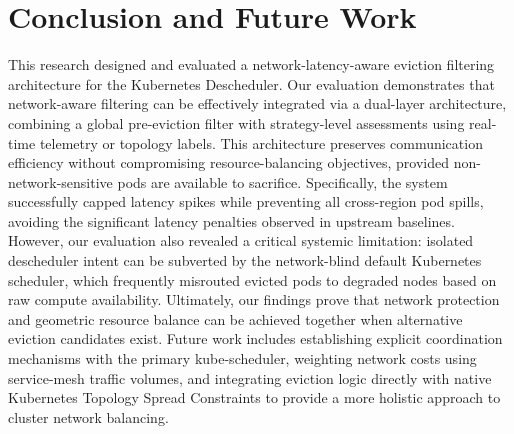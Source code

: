 \section{Conclusion and Future Work}
\label{bab:5}

This research designed and evaluated a network-latency-aware eviction filtering architecture for the Kubernetes Descheduler. Our evaluation demonstrates that network-aware filtering can be effectively integrated via a dual-layer architecture, combining a global pre-eviction filter with strategy-level assessments using real-time telemetry or topology labels. This architecture preserves communication efficiency without compromising resource-balancing objectives, provided non-network-sensitive pods are available to sacrifice. Specifically, the system successfully capped latency spikes while preventing all cross-region pod spills, avoiding the significant latency penalties observed in upstream baselines. However, our evaluation also revealed a critical systemic limitation: isolated descheduler intent can be subverted by the network-blind default Kubernetes scheduler, which frequently misrouted evicted pods to degraded nodes based on raw compute availability. Ultimately, our findings prove that network protection and geometric resource balance can be achieved together when alternative eviction candidates exist. Future work includes establishing explicit coordination mechanisms with the primary kube-scheduler, weighting network costs using service-mesh traffic volumes, and integrating eviction logic directly with native Kubernetes Topology Spread Constraints to provide a more holistic approach to cluster network balancing.
